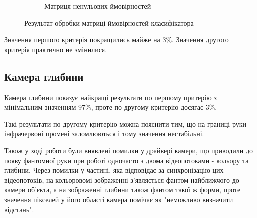 \begin{figure}[H]
\begin{subfigure}[b]{0.45\textwidth}
		\caption{Матриця ненульових ймовірностей}
		\label{fig:b_end_gen}
	\end{subfigure}
	\caption{Результат обробки матриці ймовірностей класифікатора}
	\label{fig:bayesian_representation_end}
\end{figure}

Значення першого критерія покращились майже на 3\%. Значення другого критерія практично не змінилися.

\subsection{Камера глибини}

Камера глибини показує найкращі результати по першому притерію з мінімальним значенням 97\%, проте по другому критерію досягає 3\%.

Такі результати по другому критерію можна пояснити тим, що на границі руки інфрачервоні промені заломлюються і тому значення нестабільні.

Також у ході роботи були виявлені помилки у драйвері камери, що приводили до появу фантомної руки при роботі одночасто з двома відеопотоками - кольору та глибини. Через помилки у частині, яка відповідає за синхронізацію цих відеопотоків, на кольоровомі зображенні з'являється фантом найближчого до камери об'єкта, а на зображенні глибини також фантом такої ж форми, проте значення пікселей у його області камера помічає як "неможливо визначити відстань".